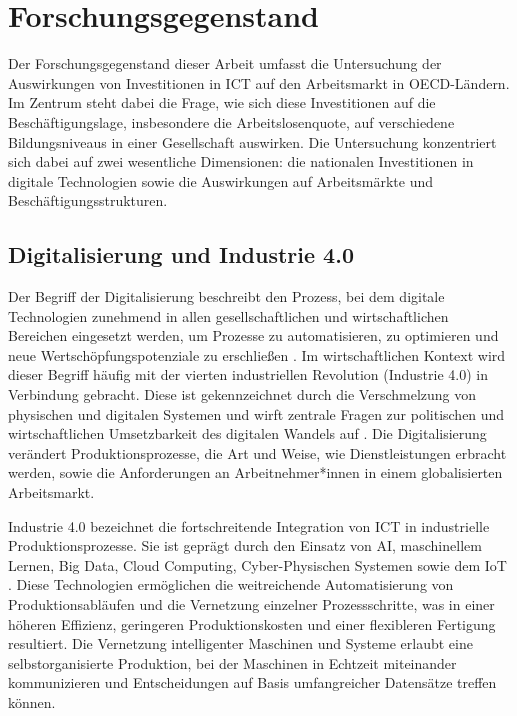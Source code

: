 
\section{Forschungsgegenstand}

Der Forschungsgegenstand dieser Arbeit umfasst die Untersuchung der Auswirkungen von 
Investitionen in \ac{ICT} auf den Arbeitsmarkt in \ac{OECD}-Ländern. Im Zentrum steht 
dabei die Frage, wie sich diese Investitionen auf die Beschäftigungslage, insbesondere die 
Arbeitslosenquote, auf verschiedene Bildungsniveaus in einer Gesellschaft auswirken. Die 
Untersuchung konzentriert sich dabei auf zwei wesentliche Dimensionen: die nationalen 
Investitionen in digitale Technologien sowie die Auswirkungen auf Arbeitsmärkte und 
Beschäftigungsstrukturen.


\subsection{Digitalisierung und Industrie 4.0}

Der Begriff der Digitalisierung beschreibt den Prozess, bei dem digitale Technologien 
zunehmend in allen gesellschaftlichen und wirtschaftlichen Bereichen eingesetzt werden, um 
Prozesse zu automatisieren, zu optimieren und neue Wertschöpfungspotenziale zu erschließen 
\parencite[S. 6]{brennen2016theinternational}. Im wirtschaftlichen Kontext wird dieser 
Begriff häufig mit der vierten industriellen Revolution (Industrie 4.0) in Verbindung 
gebracht. Diese ist gekennzeichnet durch die Verschmelzung von physischen und digitalen 
Systemen und wirft zentrale Fragen zur politischen und wirtschaftlichen Umsetzbarkeit des 
digitalen Wandels auf \parencite[S. 114]{hofman2018arbeit}. Die Digitalisierung verändert 
Produktionsprozesse, die Art und Weise, wie Dienstleistungen erbracht werden, sowie die 
Anforderungen an Arbeitnehmer*innen in einem globalisierten Arbeitsmarkt.

Industrie 4.0 bezeichnet die fortschreitende Integration von \ac{ICT} in industrielle 
Produktionsprozesse. Sie ist geprägt durch den Einsatz von \ac{AI}, maschinellem Lernen, 
Big Data, Cloud Computing, Cyber-Physischen Systemen sowie dem \ac{IoT} 
\parencite[S. 22]{kagermann2013recommendations}. Diese Technologien ermöglichen die 
weitreichende Automatisierung von Produktionsabläufen und die Vernetzung einzelner 
Prozessschritte, was in einer höheren Effizienz, geringeren Produktionskosten und einer 
flexibleren Fertigung resultiert. Die Vernetzung intelligenter Maschinen und Systeme 
erlaubt eine selbstorganisierte Produktion, bei der Maschinen in Echtzeit miteinander 
kommunizieren und Entscheidungen auf Basis umfangreicher Datensätze treffen können.

